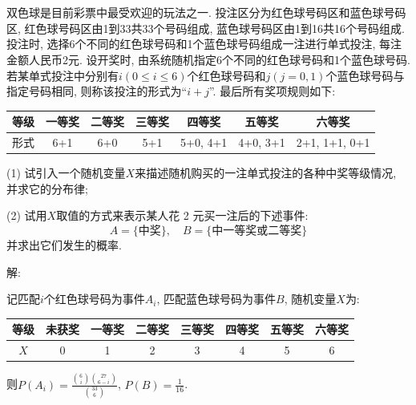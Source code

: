 \documentclass[standard]{ExBook}
\providecommand{\kaishu}{}
\renewcommand{\kaishu}{\CJKfamily{zhkai}}
\renewenvironment{shaded}{%
  \def\FrameCommand{\fboxsep=\FrameSep \colorbox{shadecolor}}%
  \MakeFramed{\advance\hsize-\width \FrameRestore}%
}{%
  \endMakeFramed
}
\begin{document}

\section{\kaishu{随机变量及其分布}}

\begin{qitems}
    \begin{bbox}
    \begin{shaded}
        \qitem
双色球是目前彩票中最受欢迎的玩法之一. 投注区分为红色球号码区和蓝色球号码区, 红色球号码区由1到33共33个号码组成, 蓝色球号码区由1到16共16个号码组成.投注时, 选择6个不同的红色球号码和1个蓝色球号码组成一注进行单式投注, 每注金额人民币2元. 设开奖时, 由系统随机指定6个不同的红色球号码和1个蓝色球号码. 若某单式投注中分别有\( i (0 \le i \le 6) \)个红色球号码和\( j (j = 0, 1) \)个蓝色球号码与指定号码相同, 则称该投注的形式为``\( i+j \)''. 最后所有奖项规则如下:
\begin{center}
\setlength{\tabcolsep}{13pt}
\begin{tabular}{c|c|c|c|c|c|c}
\hline
等级 & 一等奖 & 二等奖 & 三等奖 & 四等奖 & 五等奖 & 六等奖 \\
\hline
形式 & 6+1 & 6+0 & 5+1 & 5+0, 4+1 & 4+0, 3+1 & 2+1, 1+1, 0+1 \\
\hline
\end{tabular}
\end{center}
(1) 试引入一个随机变量\( X \)来描述随机购买的一注单式投注的各种中奖等级情况, 并求它的分布律;

(2) 试用\( X \)取值的方式来表示某人花 2 元买一注后的下述事件:
\[
A = \{\text{中奖}\}, \quad B = \{\text{中一等奖或二等奖}\}
\]
并求出它们发生的概率.
    \end{shaded}
    \end{bbox}

\vspace{\dimexpr2.5cm-5em\relax}

解: 

记匹配$i$个红色球号码为事件$A_{i}$, 匹配蓝色球号码为事件$B$, 随机变量$X$为:
\begin{center}
\setlength{\tabcolsep}{13pt}
\begin{tabular}{c|c|c|c|c|c|c|c}
\hline
等级 & 未获奖 & 一等奖 & 二等奖 & 三等奖 & 四等奖 & 五等奖 & 六等奖 \\
\hline
$X$ & 0 & 1 & 2 & 3 & 4 & 5 & 6 \\
\hline
\end{tabular}
\end{center}
则$P(A_{i})=\displaystyle\frac{\binom{6}{i}\binom{27}{6-i}}{\binom{33}{6}}$, $P(B)=\displaystyle\frac{1}{16}$.


\end{qitems}
\end{document}
